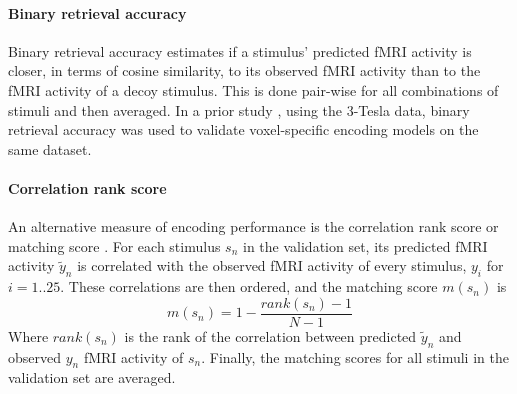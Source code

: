 \paragraph{Binary retrieval accuracy}

Binary retrieval accuracy \citep{ML08} estimates if a stimulus'
predicted f{MRI} activity is closer, in terms of cosine similarity, to its
observed f{MRI} activity than to the f{MRI} activity of a decoy stimulus.
This is done pair-wise for all combinations of stimuli and
then averaged.
In a prior study \citep{CTK+2012}, using the 3-Tesla data, binary retrieval
accuracy was used to validate voxel-specific encoding models on the same
dataset.

\paragraph{Correlation rank score}
%
An alternative measure of encoding performance is the correlation rank score or
matching score \citep{SF14}. For each stimulus $s_{n}$ in the validation set,
its predicted f{MRI} activity $\widetilde{y}_{n}$ is correlated with the
observed f{MRI} activity of every stimulus, $y_{i}$ for $i=1..25$. These
correlations are then ordered, and the  matching score $m(s_{n})$ is \[
m(s_{n}) = 1-\frac{rank(s_{n})-1}{N-1} \] Where $rank(s_{n})$ is the rank of
the correlation between predicted $\widetilde{y}_{n}$ and observed $y_{n}$
f{MRI} activity of $s_{n}$. Finally, the matching scores for all stimuli in the
validation set are averaged.

